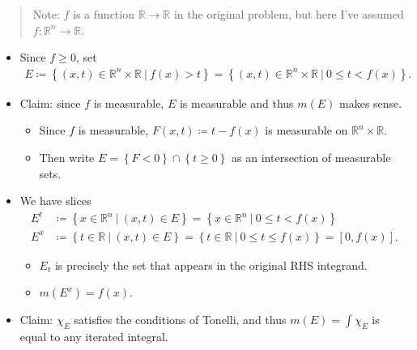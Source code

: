 \begin{solution}

\envlist

\begin{quote}
Note: \(f\) is a function \({\mathbb{R}}\to {\mathbb{R}}\) in the
original problem, but here I've assumed
\(f:{\mathbb{R}}^n\to {\mathbb{R}}\).
\end{quote}

\begin{itemize}
\item
  Since \(f\geq 0\), set
  \begin{align*}
  E\coloneqq\left\{{(x, t) \in {\mathbb{R}}^{n} \times{\mathbb{R}}{~\mathrel{\Big|}~}f(x) > t}\right\}
  = \left\{{(x, t) \in {\mathbb{R}}^n \times{\mathbb{R}}{~\mathrel{\Big|}~}0 \leq t < f(x)}\right\}
  .\end{align*}
\item
  Claim: since \(f\) is measurable, \(E\) is measurable and thus
  \(m(E)\) makes sense.

  \begin{itemize}
  \tightlist
  \item
    Since \(f\) is measurable, \(F(x, t) \coloneqq t - f(x)\) is
    measurable on \({\mathbb{R}}^n \times{\mathbb{R}}\).
  \item
    Then write
    \(E = \left\{{F < 0}\right\} \cap\left\{{t\geq 0}\right\}\) as an
    intersection of measurable sets.
  \end{itemize}
\item
  We have slices
  \begin{align*}
  E^t &\coloneqq\left\{{x\in {\mathbb{R}}^n {~\mathrel{\Big|}~}(x, t) \in E}\right\} = \left\{{x\in {\mathbb{R}}^n {~\mathrel{\Big|}~}0 \leq t < f(x)}\right\} \\
  E^x &\coloneqq\left\{{t\in {\mathbb{R}}{~\mathrel{\Big|}~}(x, t) \in E}\right\} = \left\{{t\in {\mathbb{R}}{~\mathrel{\Big|}~}0 \leq t \leq f(x)}\right\} = [0, f(x)]
  .\end{align*}

  \begin{itemize}
  \tightlist
  \item
    \(E_t\) is precisely the set that appears in the original RHS
    integrand.
  \item
    \(m(E^x) = f(x)\).
  \end{itemize}
\item
  Claim: \(\chi_E\) satisfies the conditions of Tonelli, and thus
  \(m(E) = \int \chi_E\) is equal to any iterated integral.


\end{itemize}
\end{solution}
